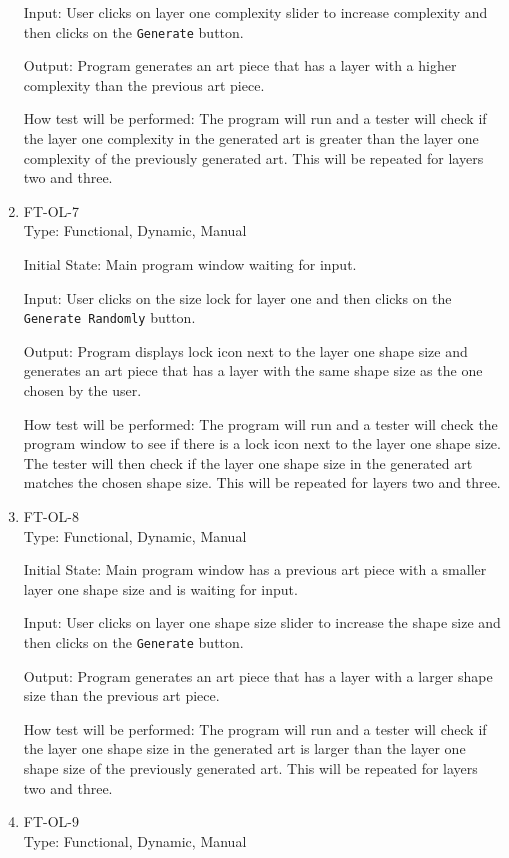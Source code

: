 \documentclass[12pt, titlepage]{article}
\begin{document}
\begin{enumerate}
Input: User clicks on layer one complexity slider to increase complexity and then clicks on the \texttt{Generate} button.

Output: Program generates an art piece that has a layer with a higher complexity than the previous art piece.

How test will be performed: The program will run and a tester will check if the layer one complexity in the generated art is greater than the layer one complexity of the previously generated art. This will be repeated for layers two and three.

\item{FT-OL-7\\}
Type: Functional, Dynamic, Manual

Initial State: Main program window waiting for input. %

Input: User clicks on the size lock for layer one and then clicks on the \texttt{Generate Randomly} button.

Output: Program displays lock icon next to the layer one shape size and generates an art piece that has a layer with the same shape size as the one chosen by the user.

How test will be performed: The program will run and a tester will check the program window to see if there is a lock icon next to the layer one shape size. The tester will then check if the layer one shape size in the generated art matches the chosen shape size. This will be repeated for layers two and three.

\item{FT-OL-8\\}
Type: Functional, Dynamic, Manual

Initial State: Main program window has a previous art piece with a smaller layer one shape size and is waiting for input. %

Input: User clicks on layer one shape size slider to increase the shape size and then clicks on the \texttt{Generate} button.

Output: Program generates an art piece that has a layer with a larger shape size than the previous art piece.

How test will be performed: The program will run and a tester will check if the layer one shape size in the generated art is larger than the layer one shape size of the previously generated art. This will be repeated for layers two and three.

\item{FT-OL-9\\}
Type: Functional, Dynamic, Manual


\end{enumerate}
\end{document}
